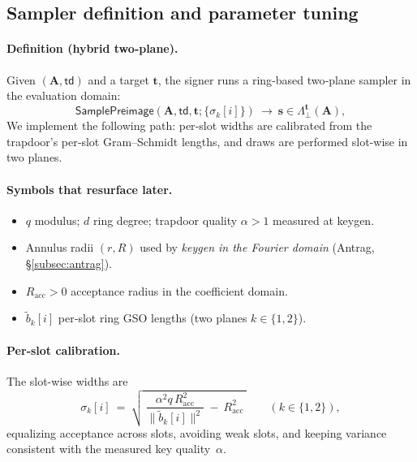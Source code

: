\subsection{Sampler definition and parameter tuning}
\label{subsec:tuning}

\paragraph{Definition (hybrid two‑plane).}
Given $(\mathbf{A},\mathsf{td})$ and a target $\mathbf{t}$, the signer runs a ring‑based two‑plane sampler in the evaluation domain:
\[
  \mathsf{SamplePreimage}(\mathbf{A},\mathsf{td},\mathbf{t}; \{\sigma_k[i]\})\ \longrightarrow\ \mathbf{s}\in \Lambda_{\perp}^{\mathbf{t}}(\mathbf{A}),
\]
We implement the following path: per‑slot widths are calibrated from the trapdoor’s per‑slot Gram–Schmidt lengths, and draws are performed slot-wise in two planes. \cite{cryptoeprint:2023/1335}

\paragraph{Symbols that resurface later.}
\begin{itemize}[leftmargin=1.25em]
  \item $q$ modulus; $d$ ring degree; trapdoor quality $\alpha>1$ measured at keygen.
  \item Annulus radii $(r,R)$ used by \emph{keygen in the Fourier domain} (Antrag, \S\ref{subsec:antrag}).
  \item $R_{\mathrm{acc}}>0$ acceptance radius in the coefficient domain.
  \item $\widetilde{b}_k[i]$ per‑slot ring GSO lengths (two planes $k\in\{1,2\}$).
\end{itemize}

\paragraph{Per‑slot calibration.}
The slot-wise widths are
\[
  \sigma_k[i]\ =\ \sqrt{\ \frac{\alpha^2 q\,R_{\mathrm{acc}}^2}{\|\widetilde{b}_k[i]\|^2}\ -\ R_{\mathrm{acc}}^2\ }\qquad(k\in\{1,2\}),
\]
equalizing acceptance across slots, avoiding weak slots, and keeping variance consistent with the measured key quality~$\alpha$.

